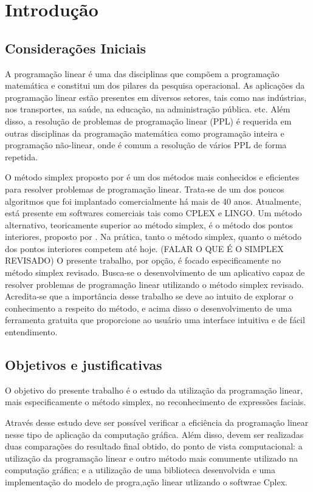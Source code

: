\chapter{Introdução}

\section{Considerações Iniciais}
A programação linear é uma das disciplinas que compõem a programação matemática e constitui um dos pilares da pesquisa operacional. As aplicações da programação linear estão presentes em diversos setores, tais como nas indústrias, nos transportes, na saúde, na educação, na administração pública. etc.  Além disso, a resolução de problemas de programação linear (PPL) é requerida em outras disciplinas da programação matemática como programação inteira e programação não-linear, onde é comum a resolução de vários PPL de forma repetida.

O método simplex proposto por  é um dos métodos mais conhecidos e eficientes para resolver problemas de programação linear. Trata-se de um dos poucos algoritmos que foi implantado comercialmente há mais de 40 anos. Atualmente, está presente em softwares comerciais tais como CPLEX e LINGO. Um método alternativo, teoricamente superior ao método simplex, é o método dos pontos interiores, proposto por . Na prática, tanto o método simplex, quanto o método dos pontos interiores competem até hoje.  
(FALAR O QUE É O SIMPLEX REVISADO)
O presente trabalho, por opção, é focado especificamente no método simplex revisado. Busca-se o desenvolvimento de um aplicativo capaz de resolver problemas de programação linear utilizando o método simplex revisado. Acredita-se que a importância desse trabalho se deve ao intuito de explorar o conhecimento a respeito do método, e acima disso o desenvolvimento de uma ferramenta gratuita que proporcione ao usuário uma interface intuitiva e de fácil entendimento.

\section{Objetivos e justificativas}
O objetivo do presente trabalho é o estudo da utilização da programação linear, mais especificamente o método simplex, no reconhecimento de expressões faciais. 

Através desse estudo deve ser possível verificar a eficiência da programação linear nesse tipo de aplicação da computação gráfica. Além disso, devem ser realizadas duas comparações do resultado final obtido, do ponto de vista computacional: a utilização da programação linear e outro método mais comumente utilizado na computação gráfica; e a utilização de uma biblioteca desenvolvida e uma implementação do modelo de progra,ação linear utlizando o softwrae Cplex.

